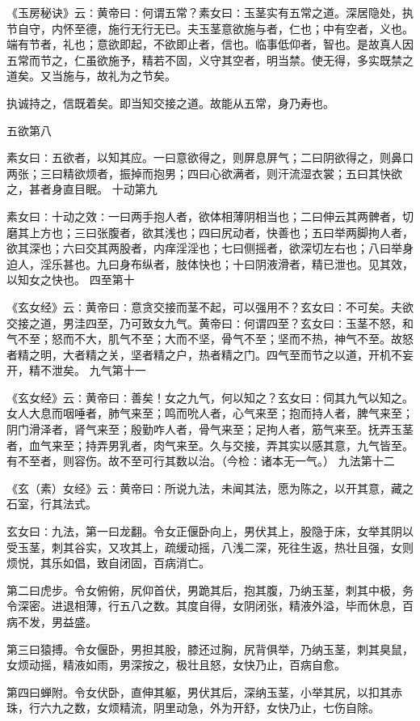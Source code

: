 \documentclass[a4paper,12pt,UTF8,twoside]{ctexbook}
\begin{document}
《玉房秘诀》云∶黄帝曰∶何谓五常？素女曰∶玉茎实有五常之道。深居隐处，执节自守，内怀至德，施行无行无已。夫玉茎意欲施与者，仁也；中有空者，义也。端有节者，礼也；意欲即起，不欲即止者，信也。临事低仰者，智也。是故真人因五常而节之，仁虽欲施予，精若不固，义守其空者，明当禁。使无得，多实既禁之道矣。又当施与，故礼为之节矣。

执诚持之，信既着矣。即当知交接之道。故能从五常，身乃寿也。

五欲第八

素女曰∶五欲者，以知其应。一曰意欲得之，则屏息屏气；二曰阴欲得之，则鼻口两张；三曰精欲烦者，振掉而抱男；四曰心欲满者，则汗流湿衣裳；五曰其快欲之，甚者身直目眠。
十动第九

素女曰∶十动之效∶一曰两手抱人者，欲体相薄阴相当也；二曰伸云其两髀者，切磨其上方也；三曰张腹者，欲其浅也；四曰尻动者，快善也；五曰举两脚拘人者，欲其深也；六曰交其两股者，内痒淫淫也；七曰侧摇者，欲深切左右也；八曰举身迫人，淫乐甚也。九曰身布纵者，肢体快也；十曰阴液滑者，精已泄也。见其效，以知女之快也。
四至第十

《玄女经》云∶黄帝曰∶意贪交接而茎不起，可以强用不？玄女曰∶不可矣。夫欲交接之道，男洼四至，乃可致女九气。黄帝曰∶何谓四至？玄女曰∶玉茎不怒，和气不至；怒而不大，肌气不至；大而不坚，骨气不至；坚而不热，神气不至。故怒者精之明，大者精之关，坚者精之户，热者精之门。四气至而节之以道，开机不妄开，精不泄矣。
九气第十一

《玄女经》云∶黄帝曰∶善矣！女之九气，何以知之？玄女曰∶伺其九气以知之。女人大息而咽唾者，肺气来至；鸣而吮人者，心气来至；抱而持人者，脾气来至；阴门滑泽者，肾气来至；殷勤咋人者，骨气来至；足拘人者，筋气来至。抚弄玉茎者，血气来至；持弄男乳者，肉气来至。久与交接，弄其实以感其意，九气皆至。有不至者，则容伤。故不至可行其数以治。（今检∶诸本无一气。）
九法第十二

《玄（素）女经》云∶黄帝曰∶所说九法，未闻其法，愿为陈之，以开其意，藏之石室，行其法式。

玄女曰∶九法，第一曰龙翻。令女正偃卧向上，男伏其上，股隐于床，女举其阴以受玉茎，刺其谷实，又攻其上，疏缓动摇，八浅二深，死往生返，热壮且强，女则烦悦，其乐如倡，致自闭固，百病消亡。

第二曰虎步。令女俯俯，尻仰首伏，男跪其后，抱其腹，乃纳玉茎，刺其中极，务令深密。进退相薄，行五八之数。其度自得，女阴闭张，精液外溢，毕而休息，百病不发，男益盛。

第三曰猿搏。令女偃卧，男担其股，膝还过胸，尻背俱举，乃纳玉茎，刺其臭鼠，女烦动摇，精液如雨，男深按之，极壮且怒，女快乃止，百病自愈。

第四曰蝉附。令女伏卧，直伸其躯，男伏其后，深纳玉茎，小举其尻，以扣其赤珠，行六九之数，女烦精流，阴里动急，外为开舒，女快乃止，七伤自除。
\end{document}
